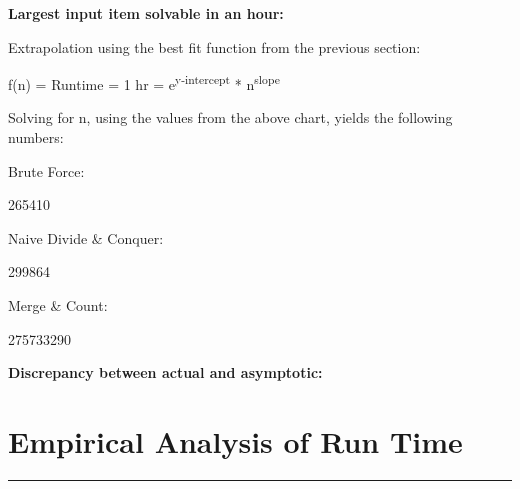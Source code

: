 \documentclass[letterpaper,10pt,titlepage,fleqn]{article}
\begin{document}
\begin{centering}
\textbf{Largest input item solvable in an hour:}
\end{centering}

Extrapolation using the best fit function from the previous section: 

f(n) = Runtime = 1 hr = e\textsuperscript{y-intercept} * n\textsuperscript{slope}

Solving for n, using the values from the above chart, yields the following numbers: 

Brute Force:

265410

Naive Divide \& Conquer:

299864

Merge \& Count:

275733290

\begin{centering}
\textbf{Discrepancy between actual and asymptotic:}
\end{centering}


\newpage

\section*{Empirical Analysis of Run Time}
\hrule
\end{document}
